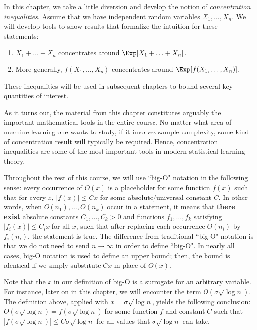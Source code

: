\setcounter{section}{0}


In this chapter, we take a little diversion and develop the notion of \emph{concentration inequalities}. Assume that we have independent random variables $X_1, \ldots, X_n$. We will develop tools to show results that formalize the intuition for these statements:
\begin{enumerate}
    \item $X_1 + \ldots + X_n$ concentrates around $\Exp[X_1 + \ldots + X_n]$.
    \item More generally, $f(X_1, \ldots, X_n)$ concentrates around $\Exp[f(X_1, \ldots, X_n)]$.
\end{enumerate}
These inequalities will be used in subsequent chapters to bound several key quantities of interest.

As it turns out, the material from this chapter constitutes arguably the important mathematical tools in the entire course. No matter what area of machine learning one wants to study, if it involves sample complexity, some kind of concentration result will typically be required. Hence, concentration inequalities are some of the most important tools in modern statistical learning theory.


Throughout the rest of this course, we will use ``big-O" notation in the following sense: every occurrence of $O(x)$ is a placeholder for some function $f(x)$ such that for every $x$, $|f(x)| \leq Cx$ for some absolute/universal constant $C$. In other words, when $O(n_1),\dots, O(n_k)$ occur in a statement, it means that \textbf{there exist} absolute constants $C_1,\dots, C_k > 0$ and functions $f_1,\dots, f_k$ satisfying $|f_i(x)|\le C_ix$ for all $x$, such that after replacing each occurrence $O(n_i)$ by $f_i(n_i)$,  the statement is true.  The difference from traditional ``big-O" notation is that we do not need to send $n \to \infty$ in order to define ``big-O". In nearly all cases, big-O notation is used to define an upper bound; then, the bound is identical if we simply substitute $Cx$ in place of $O(x)$. 

Note that the $x$ in our definition of big-O is a surrogate for an arbitrary variable. For instance, later on in this chapter, we will encounter the term $O(\sigma \sqrt{\log n})$. The definition above, applied with $x = \sigma \sqrt{\log n}$, yields the following conclusion: $O(\sigma \sqrt{\log n}) = f(\sigma \sqrt{\log n})$ for some function $f$ and constant $C$ such that $|f(\sigma \sqrt{\log n})| \leq C \sigma  \sqrt{\log n}$ for all values that $\sigma \sqrt{\log n}$ can take. 

